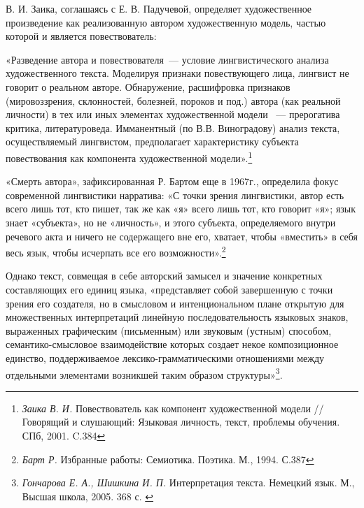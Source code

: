 \documentclass{kursa4}
\begin{document}
{      В. И. Заика, соглашаясь с Е. В. Падучевой, определяет художественное
      произведение как реализованную автором художественную модель, частью
      которой и является повествователь:

      «Разведение автора и повествователя~--- условие лингвистического
      анализа художественного текста. Моделируя признаки повествующего лица,
      лингвист не говорит о реальном авторе. Обнаружение, расшифровка
      признаков (мировоззрения, склонностей, болезней, пороков и под.) автора
      (как реальной личности) в тех или иных элементах художественной модели
     ~--- прерогатива критика, литературоведа. Имманентный (по В.В.
      Виноградову) анализ текста, осуществляемый лингвистом, предполагает
      характеристику субъекта повествования как компонента художественной
      модели».\footnote{\textit{{Заика В. И.
      }}{Повествователь как компонент художественной модели
      //Говорящий и слушающий: Языковая личность, текст, проблемы обучения.
      СПб, 2001. C.384}}

      «Смерть автора», зафиксированная Р. Бартом еще в 1967г., определила
      фокус современной лингвистики нарратива:\newline
      «С точки зрения лингвистики, автор есть всего лишь тот, кто пишет,
      так же как «я» всего лишь тот, кто говорит «я»; язык знает «субъекта»,
      но не «личность», и этого субъекта, определяемого внутри речевого акта
      и ничего не содержащего вне его, хватает, чтобы «вместить» в себя весь
      язык, чтобы исчерпать все его
      возможности».\footnote{\textit{{Барт
      Р.}}{ Избранные работы: Семиотика. Поэтика. М., 1994.
      С.387}}

      Однако текст, совмещая в себе авторский замысел и значение
      конкретных составляющих его единиц языка, «представляет собой
      завершенную с точки зрения его создателя, но в смысловом и
      интенциональном плане открытую для множественных интерпретаций линейную
      последовательность языковых знаков, выраженных графическим (письменным)
      или звуковым (устным) способом, семантико-смысловое взаимодействие
      которых создает некое композиционное единство, поддерживаемое
      лексико-грамматическими отношениями между отдельными элементами
      возникшей таким образом
      структуры»\footnote{\textit{{Гончарова Е. А., Шишкина
      И. П. }}{Интерпретация текста. Немецкий язык. М.,
      Высшая школа, 2005. 368 с. }}.

}
\end{document}
